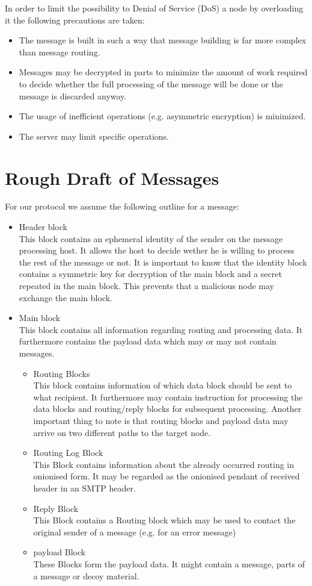 In order to limit the possibility to Denial of Service (DoS) a node by overloading it the following precautions are taken:
\begin{itemize}
	\item The message is built in such a way that message building is far more complex than message routing.
	\item Messages may be decrypted in parts to minimize the amount of work required to decide whether the full processing of the message will be done or the message is discarded anyway.
	\item The usage of inefficient operations (e.g. asymmetric encryption) is minimized.
	\item The server may limit specific operations.
\end{itemize}

\section{Rough Draft of Messages}
For our protocol we assume the following outline for a message:
\begin{itemize}
	\item Header block\\ 
	This block contains an ephemeral identity of the sender on the message processing host. It allows the host to decide wether he is willing to process the rest of the message or not. It is important to know that the identity block contains a symmetric key for decryption of the main block and a secret repeated in the main block. This prevents that a malicious node may exchange the main block.
	\item Main block\\
	This block contains all information regarding routing and processing data. It furthermore contains the payload data which may or may not contain messages.
	\begin{itemize}
		\item Routing Blocks\\
		This block contains information of which data block should be sent to what recipient. It furthermore may contain instruction for processing the data blocks and routing/reply blocks for subsequent processing. Another important thing to note is that routing blocks and payload data may arrive on two different paths to the target node.
		\item Routing Log Block\\
		This Block contains information about the already occurred routing in onionised form. It may be regarded as the onionised pendant of received header in an SMTP header.
		\item Reply Block\\
		This Block contains a Routing block which may be used to contact the original sender of a message (e.g. for an error message)
		\item payload Block\\
		These Blocks form the payload data. It might contain a message, parts of a message or decoy material.
	\end{itemize}      
\end{itemize}

